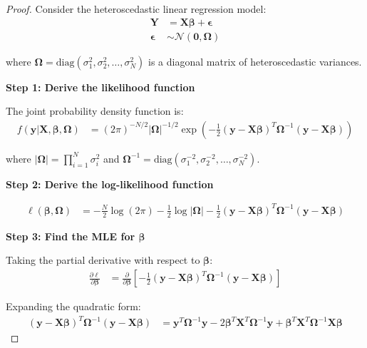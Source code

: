 \documentclass{article}
\begin{document}
\begin{proof}
Consider the heteroscedastic linear regression model:
\begin{align}
\mathbf{Y} &= \mathbf{X}\boldsymbol{\beta} + \boldsymbol{\epsilon} \label{eq:hetero_model}\\
\boldsymbol{\epsilon} &\sim \mathcal{N}(\mathbf{0}, \boldsymbol{\Omega})
\end{align}

where $\boldsymbol{\Omega} = \text{diag}(\sigma_1^2, \sigma_2^2, \ldots, \sigma_N^2)$ is a diagonal matrix of heteroscedastic variances.

\textbf{Step 1: Derive the likelihood function}

The joint probability density function is:
\begin{align}
f(\mathbf{y}|\mathbf{X}, \boldsymbol{\beta}, \boldsymbol{\Omega}) &= (2\pi)^{-N/2}|\boldsymbol{\Omega}|^{-1/2} \exp\left(-\frac{1}{2}(\mathbf{y} - \mathbf{X}\boldsymbol{\beta})^T\boldsymbol{\Omega}^{-1}(\mathbf{y} - \mathbf{X}\boldsymbol{\beta})\right)
\end{align}

where $|\boldsymbol{\Omega}| = \prod_{i=1}^N \sigma_i^2$ and $\boldsymbol{\Omega}^{-1} = \text{diag}(\sigma_1^{-2}, \sigma_2^{-2}, \ldots, \sigma_N^{-2})$.

\textbf{Step 2: Derive the log-likelihood function}

\begin{align}
\ell(\boldsymbol{\beta}, \boldsymbol{\Omega}) &= -\frac{N}{2}\log(2\pi) - \frac{1}{2}\log|\boldsymbol{\Omega}| - \frac{1}{2}(\mathbf{y} - \mathbf{X}\boldsymbol{\beta})^T\boldsymbol{\Omega}^{-1}(\mathbf{y} - \mathbf{X}\boldsymbol{\beta}) \label{eq:hetero_loglik}
\end{align}

\textbf{Step 3: Find the MLE for $\boldsymbol{\beta}$}

Taking the partial derivative with respect to $\boldsymbol{\beta}$:
\begin{align}
\frac{\partial \ell}{\partial \boldsymbol{\beta}} &= \frac{\partial}{\partial \boldsymbol{\beta}}\left[-\frac{1}{2}(\mathbf{y} - \mathbf{X}\boldsymbol{\beta})^T\boldsymbol{\Omega}^{-1}(\mathbf{y} - \mathbf{X}\boldsymbol{\beta})\right]
\end{align}

Expanding the quadratic form:
\begin{align}
(\mathbf{y} - \mathbf{X}\boldsymbol{\beta})^T\boldsymbol{\Omega}^{-1}(\mathbf{y} - \mathbf{X}\boldsymbol{\beta}) &= \mathbf{y}^T\boldsymbol{\Omega}^{-1}\mathbf{y} - 2\boldsymbol{\beta}^T\mathbf{X}^T\boldsymbol{\Omega}^{-1}\mathbf{y} + \boldsymbol{\beta}^T\mathbf{X}^T\boldsymbol{\Omega}^{-1}\mathbf{X}\boldsymbol{\beta}
\end{align}


\end{proof}
\end{document}
